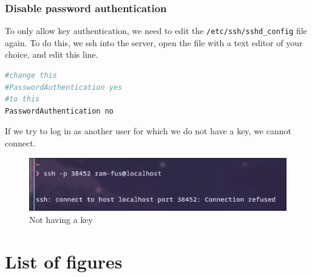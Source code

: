 \documentclass[a4paper]{article}
\newcommand{\abc}{\hfill \break}
\begin{document}
\subsubsection{Disable password authentication}
To only allow key authentication, we need to edit the \texttt{/etc/ssh/sshd\_config} file again.
To do this, we ssh into the server, open the file with a text editor of your choice, and edit this line.
\begin{lstlisting}[language=bash]
#change this
#PasswordAuthentication yes
#to this
PasswordAuthentication no
\end{lstlisting}
If we try to log in as another user for which we do not have a key, we cannot connect.
\begin{figure}[h]
	\centering
	\includegraphics[scale=0.35]{images/nokey.png}
	\caption{Not having a key}
\end{figure} \abc
\newpage

\newpage
\section{List of figures}

\listoffigures
\newpage
\end{document}
